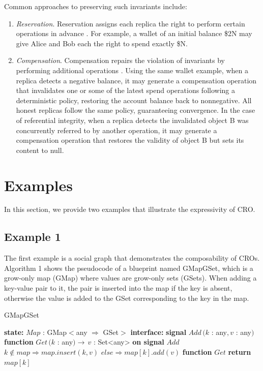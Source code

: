 \documentclass{article}
\begin{document}
Common approaches to preserving such invariants include:
\begin{enumerate}
    \item \textit{Reservation}. Reservation assigns each replica the right to perform certain operations in advance \cite{Bounded-CRDT}. For example, a wallet of an initial balance \$2N may give Alice and Bob each the right to spend exactly \$N.
    \item \textit{Compensation}. Compensation repairs the violation of invariants by performing additional operations \cite{IPA}. Using the same wallet example, when a replica detects a negative balance, it may generate a compensation operation that invalidates one or some of the latest spend operations following a deterministic policy, restoring the account balance back to nonnegative. All honest replicas follow the same policy, guaranteeing convergence. In the case of referential integrity, when a replica detects the invalidated object B was concurrently referred to by another operation, it may generate a compensation operation that restores the validity of object B but sets its content to null.
\end{enumerate}

\section{Examples}
\label{sec:headings}

In this section, we provide two examples that illustrate the expressivity of CRO.

\subsection{Example 1}

The first example is a social graph that demonstrates the composability of CROs. Algorithm 1 shows the pseudocode of a blueprint named GMapGSet, which is a grow-only map (GMap) where values are grow-only sets (GSets). When adding a key-value pair to it, the pair is inserted into the map if the key is absent, otherwise the value is added to the GSet corresponding to the key in the map.

\begin{algorithm}
\caption{GMapGSet}
\begin{algorithmic}
\State \textbf{state:}
\State \hspace{\algorithmicindent} $Map$ : GMap$<$any $\Rightarrow$ GSet$>$
\State
\State \textbf{interface:}
\State \hspace{\algorithmicindent} \textbf{signal} $Add\,(k$ : any$,v$ : any$)$
\State \hspace{\algorithmicindent} \textbf{function} $Get\,(k$ : any$) \rightarrow\,v$ : Set<any>
\State
\State \textbf{on signal} $Add$
\State\hspace{\algorithmicindent}$k \notin map \Rightarrow map.insert (k,v)$
\State\hspace{\algorithmicindent}$else\Rightarrow map[k].add(v)$
\State
\State \textbf{function} $Get$
\State\hspace{\algorithmicindent}\textbf{return} $map[k]$
\end{algorithmic}
\end{algorithm}
\end{document}
